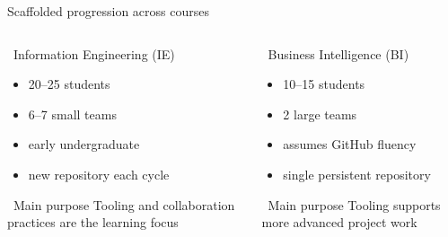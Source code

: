 \documentclass[
    NAME={Dr. Helga Ingimundardóttir},
    EMAIL={helgaingim@hi.is},
    FACULTY={Industrial Engineering},
    TITLE={Using Pull Requests to Make Collaboration Visible in CDIO Project-Based Courses},
    SEMINAR={22\textsuperscript{nd} International CDIO Conference},
    DATE={June 22\textsuperscript{nd} 2026},
    WIDE=true
]{HI-LaTeX/hi-beamer}
\begin{document}
\begin{frame}{Scaffolded progression across courses}
\begin{columns}[T,onlytextwidth]
\begin{column}{.48\textwidth}
\begin{block}{\faUser~Information Engineering (IE)}
\begin{itemize}
    \item 20--25 students
    \item 6--7 small teams
    \item early undergraduate
    \item new repository each cycle
\end{itemize}
\begin{block}{\faToolbox~Main purpose}
Tooling and collaboration practices are the learning focus
\end{block}
\end{block}
\end{column}
\begin{column}{.48\textwidth}
\begin{block}{\faUserGraduate~Business Intelligence (BI)}
\begin{itemize}
    \item 10--15 students
    \item 2 large teams
    \item assumes GitHub fluency
    \item single persistent repository
\end{itemize}
\begin{block}{\faLayerGroup~Main purpose}
Tooling supports more advanced project work
\end{block}
\end{block}
\end{column}
\end{columns}
\end{frame}
\end{document}
